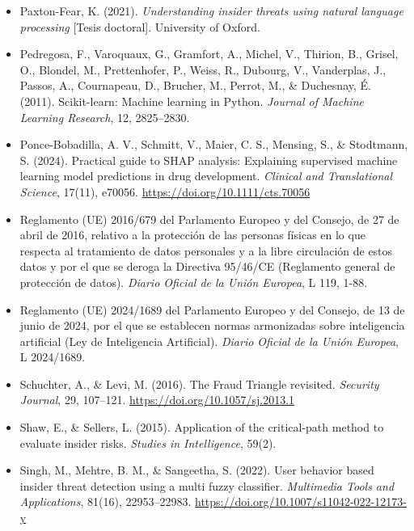 \documentclass[IB]{TFUOC}%
\begin{document}
\begin{itemize}
    \item Paxton-Fear, K. (2021). \textit{Understanding insider threats using 
    natural language processing} [Tesis doctoral]. University of Oxford.

    \item Pedregosa, F., Varoquaux, G., Gramfort, A., Michel, V., Thirion, B., 
    Grisel, O., Blondel, M., Prettenhofer, P., Weiss, R., Dubourg, V., 
    Vanderplas, J., Passos, A., Cournapeau, D., Brucher, M., Perrot, M., \& 
    Duchesnay, É. (2011). Scikit-learn: Machine learning in Python. 
    \textit{Journal of Machine Learning Research}, 12, 2825--2830.

    \item Ponce-Bobadilla, A. V., Schmitt, V., Maier, C. S., Mensing, S., \& 
    Stodtmann, S. (2024). Practical guide to SHAP analysis: Explaining 
    supervised machine learning model predictions in drug development. 
    \textit{Clinical and Translational Science}, 17(11), e70056. 
    \url{https://doi.org/10.1111/cts.70056}

    \item Reglamento (UE) 2016/679 del Parlamento Europeo y del Consejo, de 27 de abril de 2016, relativo a la protección de las personas físicas en lo que respecta al tratamiento de datos personales y a la libre circulación de estos datos y por el que se deroga la Directiva 95/46/CE (Reglamento general de protección de datos). 
    \textit{Diario Oficial de la Unión Europea}, L 119, 1-88.

    \item Reglamento (UE) 2024/1689 del Parlamento Europeo y del Consejo, de 13 de junio de 2024, por el que se establecen normas armonizadas sobre inteligencia artificial (Ley de Inteligencia Artificial).
    \textit{Diario Oficial de la Unión Europea}, L 2024/1689.

    \item Schuchter, A., \& Levi, M. (2016). The Fraud Triangle revisited. 
    \textit{Security Journal}, 29, 107--121. 
    \url{https://doi.org/10.1057/sj.2013.1}

    \item Shaw, E., \& Sellers, L. (2015). Application of the critical-path 
    method to evaluate insider risks. \textit{Studies in Intelligence}, 59(2).

    \item Singh, M., Mehtre, B. M., \& Sangeetha, S. (2022). User behavior 
    based insider threat detection using a multi fuzzy classifier. 
    \textit{Multimedia Tools and Applications}, 81(16), 22953--22983. 
    \url{https://doi.org/10.1007/s11042-022-12173-y}


\end{itemize}
\end{document}
